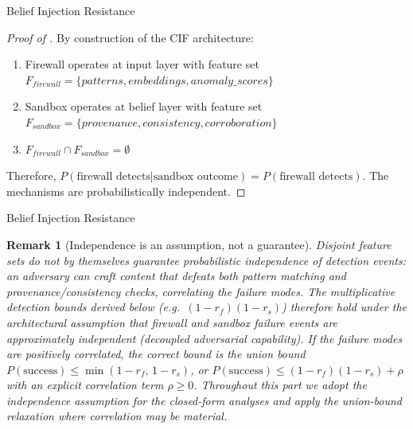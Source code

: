 \documentclass[
  ignorenonframetext,
]{beamer}
\providecommand{\cref}[1]{\texttt{\detokenize{#1}}}
\newtheorem{remark}[theorem]{Remark}
\begin{document}
\begin{frame}[allowframebreaks]{Belief Injection Resistance}
\begin{proof}[Proof of \cref{lem:defense-independence}]
By construction of the CIF architecture:
\begin{enumerate}
\item Firewall operates at input layer with feature set $F_{firewall} = \{patterns, embeddings, anomaly\_scores\}$
\item Sandbox operates at belief layer with feature set $F_{sandbox} = \{provenance, consistency, corroboration\}$
\item $F_{firewall} \cap F_{sandbox} = \emptyset$
\end{enumerate}

Therefore, $P(\text{firewall detects} | \text{sandbox outcome}) = P(\text{firewall detects})$. The mechanisms are probabilistically independent.
\end{proof}

\end{frame}

\begin{frame}[allowframebreaks]{Belief Injection Resistance}
\begin{remark}[Independence is an assumption, not a guarantee]
\label{rem:defense-independence-scope}
Disjoint feature sets do not by themselves guarantee probabilistic independence of detection events: an adversary can craft content that defeats both pattern matching and provenance/consistency checks, correlating the failure modes. The multiplicative detection bounds derived below (e.g.\ $(1-r_f)(1-r_s)$) therefore hold under the architectural \emph{assumption} that firewall and sandbox failure events are approximately independent (decoupled adversarial capability). If the failure modes are positively correlated, the correct bound is the union bound $P(\text{success}) \le \min(1-r_f,\,1-r_s)$, or $P(\text{success}) \le (1-r_f)(1-r_s) + \rho$ with an explicit correlation term $\rho \ge 0$. Throughout this part we adopt the independence assumption for the closed-form analyses and apply the union-bound relaxation where correlation may be material.
\end{remark}

\end{frame}
\end{document}

